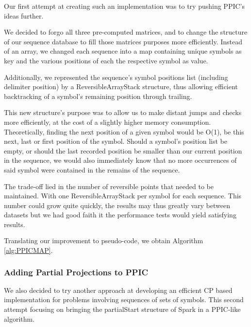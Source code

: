 \documentclass{eplmastersthesis}
\begin{document}
Our first attempt at creating such an implementation was to try pushing PPIC's ideas further. \newline

We decided to forgo all three pre-computed matrices, and to change the structure of our sequence database to fill those matrices purposes more efficiently. Instead of an array, we changed each sequence into a map containing unique symbols as key and the various positions of each the respective symbol as value. \newline

Additionally, we represented the sequence's symbol positions list (including delimiter position) by a ReversibleArrayStack structure, thus allowing efficient backtracking of a symbol's remaining position  through trailing. \newline

This new structure's purpose was to allow us to make distant jumps and checks more efficiently, at the cost of a slightly higher memory consumption. Theoretically, finding the next position of a given symbol would be O(1), be this next, last or first position of the symbol. Should a symbol's position list be empty, or should the last recorded position be smaller than our current position in the sequence, we would also immediately know that no more occurrences of said symbol were contained in the remains of the sequence. \newline

The trade-off lied in the number of reversible points that needed to be maintained. With one ReversibleArrayStack per symbol for each sequence. This number could grow quite quickly, the results may thus greatly vary between datasets but we had good faith it the performance tests would yield satisfying results. \newline

Translating our improvement to pseudo-code, we obtain Algorithm \ref{alg:PPICMAP}.

\subsubsection{Adding Partial Projections to PPIC}

We also decided to try another approach at developing an efficient CP based implementation for problems involving sequences of sets of symbols. This second attempt focusing on bringing the partialStart structure of Spark in a PPIC-like algorithm. \newline
\end{document}
